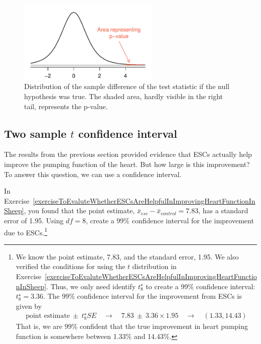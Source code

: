 \begin{figure}
\centering
\includegraphics[width=0.6\textwidth]{05/figures/stemCellTherapyForHeartsPValue/stemCellTherapyForHeartsPValue}
\caption{Distribution of the sample difference of the test statistic if the null hypothesis was true. The shaded area, hardly visible in the right tail, represents the p-value.}
\label{stemCellTherapyForHeartsPValue}
\end{figure}

\subsection{Two sample $t$ confidence interval}

The results from the previous section provided evidence that ESCs actually help improve the pumping function of the heart. But how large is this improvement? To answer this question, we can use a confidence interval. 

\begin{exercise}
In Exercise~\ref{exerciseToEvaluteWhetherESCsAreHelpfulInImprovingHeartFunctionInSheep}, you found that the point estimate, $\bar{x}_{esc} - \bar{x}_{control} = 7.83$, has a standard error of 1.95. Using $df=8$, create a 99\% confidence interval for the improvement due to ESCs.\footnote{We know the point estimate, 7.83, and the standard error, 1.95. We also verified the conditions for using the $t$ distribution in Exercise~\ref{exerciseToEvaluteWhetherESCsAreHelpfulInImprovingHeartFunctionInSheep}. Thus, we only need identify $t^{\star}_8$ to create a 99\% confidence interval: $t^{\star}_{8} = 3.36$. The 99\% confidence interval for the improvement from ESCs is given by
\begin{eqnarray*}
\text{point estimate}\ \pm\ t_{8}^{\star}SE
	\quad\to\quad 7.83\ \pm\ 3.36\times 1.95
	\quad\to\quad (1.33, 14.43)
\end{eqnarray*}
That is, we are 99\% confident that the true improvement in heart pumping function is somewhere between 1.33\% and 14.43\%.}


\end{exercise}

